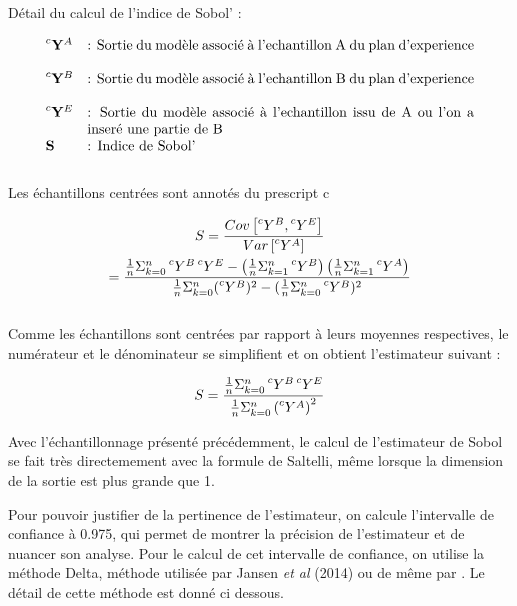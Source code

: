 \documentclass[a4paper,10pt]{article}
\begin{document}
Détail du calcul de l'indice de Sobol' :

   \[
      \begin{array}{lp{0.8\linewidth}}
        \prescript{c}{}{\mathbf{Y}}^{A}   & : Sortie du modèle associé à l'echantillon A du plan d'experience \\
        \prescript{c}{}{\mathbf{Y}}^{B}   & : Sortie du modèle associé à l'echantillon B du plan d'experience \\
        \prescript{c}{}{\mathbf{Y}}^{E}   & : Sortie du modèle associé à l'echantillon issu de A ou l'on a inseré une partie de B \\
         \mathbf{S} 					  & : Indice de Sobol' \\
      \end{array}
   \]\\
\* Les échantillons centrées sont annotés du prescript c \*

   \begin{gather}   
S = \frac{Cov\left[\prescript{c}{}{Y}^{B},\prescript{c}{}{Y}^{E}\right]}{Var\left[\prescript{c}{}{Y}^{A}\right]} \\
= \frac{\frac{1}{n}\Sigma_{k=0}^{n}\prescript{c}{}{Y}^{B}\prescript{c}{}{Y}^{E} - \left(\frac{1}{n}\Sigma_{k=1}^{n}\prescript{c}{}{Y}^{B}\right)\left(\frac{1}{n}\Sigma_{k=1}^{n}\prescript{c}{}{Y}^{A}\right)}{\frac{1}{n}\Sigma_{k=0}^{n}(\prescript{c}{}{Y}^{B})^{2}-(\frac{1}{n}\Sigma_{k=0}^{n}\prescript{c}{}{Y}^{B})^{2}}
   \end{gather}\\
   
Comme les échantillons sont centrées par rapport à leurs moyennes respectives, le numérateur et le dénominateur se simplifient et on obtient l’estimateur suivant :

	\begin{equation}
		S = \frac{\frac{1}{n}\Sigma_{k=0}^{n}\prescript{c}{}{Y}^{B}\prescript{c}{}{Y}^{E}}{\frac{1}{n}\Sigma_{k=0}^{n}\left(\prescript{c}{}{Y}^{A}\right)^{2}}
	\end{equation}


Avec l'échantillonnage présenté précédemment, le calcul de l'estimateur de Sobol se fait très directemement avec la formule de Saltelli, même lorsque la dimension de la sortie est plus grande que 1.

Pour pouvoir justifier de la pertinence de l'estimateur, on calcule l'intervalle de confiance à 0.975, qui permet de montrer la précision de l'estimateur et de nuancer son analyse. Pour le calcul de cet intervalle de confiance, on utilise la méthode Delta, méthode utilisée par Jansen \textit{et al} (2014) ou de même par \cite{dumas2017}. Le détail de cette méthode est donné ci dessous.
\end{document}
